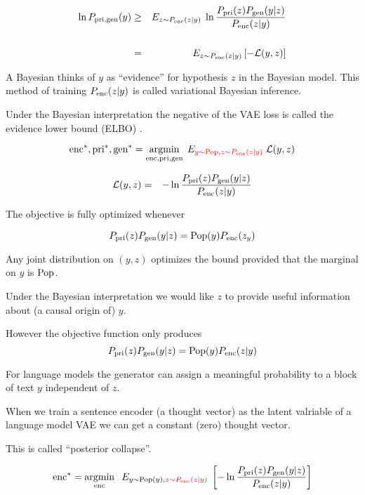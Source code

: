 {\begin{eqnarray*}
\ln P_{\mathrm{pri},\mathrm{gen}}(y) & \geq  & E_{z \sim P_{\mathrm{enc}}(z|y)}\; \ln \frac{P_{\mathrm{pri}}(z)P_{\mathrm{gen}}(y|z)}{P_{\mathrm{enc}}(z|y)} \\
\\
& = & E_{z \sim P_{\mathrm{enc}}(z|y)}\left[-{\cal L}(y,z)\right]
\end{eqnarray*}

\vfill
A Bayesian thinks of $y$ as ``evidence'' for hypothesis $z$ in the Bayesian model.  This method of training $P_{\mathrm{enc}}(z|y)$ is called {\color{red} variational Bayesian inference}.

\vfill
Under the Bayesian interpretation the negative of the VAE loss is called {\color{red} the evidence lower bound (ELBO)}    .


$$\mathrm{enc}^*,\mathrm{pri}^*,\mathrm{gen}^* = \operatorname*{argmin}_{\mathrm{enc},\mathrm{pri},\mathrm{gen}}\;E_{\color{red} y \sim \mathrm{Pop},z\sim P_{\mathrm{enc}}(z|y)}\;{\cal L}(y,z)$$

\vfill
\begin{eqnarray*}
{\cal L}(y,z) & = & - \ln \frac{P_{\mathrm{pri}}(z)P_{\mathrm{gen}}(y|z)}{P_{\mathrm{enc}}(z|y)}
\end{eqnarray*}

\vfill
The objective is fully optimized whenever

\vfill
{\color{red} $$P_{\mathrm{pri}}(z)P_{\mathrm{gen}}(y|z) = \mathrm{Pop}(y)P_{\mathrm{enc}}(z_y)$$}

\vfill
Any joint distribution on $(y,z)$ optimizes the bound provided that the marginal on $y$ is $\mathrm{Pop}$.


Under the Bayesian interpretation we would like $z$ to provide useful information about (a causal origin of) $y$.

\vfill
However the objective function only produces
$$P_{\mathrm{pri}}(z)P_{\mathrm{gen}}(y|z) = \mathrm{Pop}(y)P_{\mathrm{enc}}(z|y)$$

\vfill
For language models the generator can assign a meaningful probability to a block of text $y$ independent of $z$.

\vfill
When we train a sentence encoder (a thought vector) as the latent valriable of a language model VAE we can get a constant (zero) thought vector.

\vfill
This is called ``posterior collapse''.


$$\mathrm{enc}^* = \operatorname*{argmin}_{\mathrm{enc}}\;\;E_{y\sim \mathrm{Pop}(y),{\color{red} z\sim P_{\mathrm{enc}}(z|y)}}\;\left[- \ln \frac{P_{\mathrm{pri}}(z)P_{\mathrm{gen}}(y|z)}{P_{\mathrm{enc}}(z|y)}\right]$$

}
